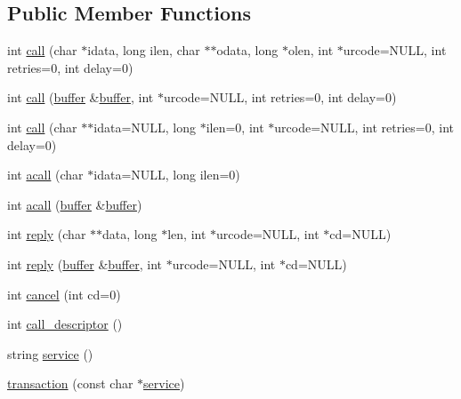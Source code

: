 \subsection*{Public Member Functions}
\begin{DoxyCompactItemize}
\item 
int \hyperlink{classatmi_1_1transaction_a1251381692ec4e235ca9179a84273484}{call} (char $\ast$idata, long ilen, char $\ast$$\ast$odata, long $\ast$olen, int $\ast$urcode=N\+U\+LL, int retries=0, int delay=0)
\item 
int \hyperlink{classatmi_1_1transaction_afc2bebb88fb56466d0a41d45e6060377}{call} (\hyperlink{classatmi_1_1buffer}{buffer} \&\hyperlink{classatmi_1_1buffer}{buffer}, int $\ast$urcode=N\+U\+LL, int retries=0, int delay=0)
\item 
int \hyperlink{classatmi_1_1transaction_aa5fb9edab0ee78c39b73936ca59a0b02}{call} (char $\ast$$\ast$idata=N\+U\+LL, long $\ast$ilen=0, int $\ast$urcode=N\+U\+LL, int retries=0, int delay=0)
\item 
int \hyperlink{classatmi_1_1transaction_abf3ecf74af155274d4b500df2e6ec69b}{acall} (char $\ast$idata=N\+U\+LL, long ilen=0)
\item 
int \hyperlink{classatmi_1_1transaction_a3abfbaad23aafaccd6b96af66d36e329}{acall} (\hyperlink{classatmi_1_1buffer}{buffer} \&\hyperlink{classatmi_1_1buffer}{buffer})
\item 
int \hyperlink{classatmi_1_1transaction_a810c7fdad2bc26722027d4d0565f4c9a}{reply} (char $\ast$$\ast$data, long $\ast$len, int $\ast$urcode=N\+U\+LL, int $\ast$cd=N\+U\+LL)
\item 
int \hyperlink{classatmi_1_1transaction_a3bcbf7ec6d3b9909e10368ffb6e3d39d}{reply} (\hyperlink{classatmi_1_1buffer}{buffer} \&\hyperlink{classatmi_1_1buffer}{buffer}, int $\ast$urcode=N\+U\+LL, int $\ast$cd=N\+U\+LL)
\item 
int \hyperlink{classatmi_1_1transaction_a380d536258d33a801973100d6e2ae622}{cancel} (int cd=0)
\item 
int \hyperlink{classatmi_1_1transaction_a11018dd9689a5a66d0510ae78bb048da}{call\+\_\+descriptor} ()
\item 
string \hyperlink{classatmi_1_1transaction_a16d4442ea8f6582ec4820a064fc9a825}{service} ()
\item 
\hyperlink{classatmi_1_1transaction_a0cb59a4954d3fc4b903c0f2876dd00b3}{transaction} (const char $\ast$\hyperlink{classatmi_1_1transaction_a16d4442ea8f6582ec4820a064fc9a825}{service})
\end{DoxyCompactItemize}
